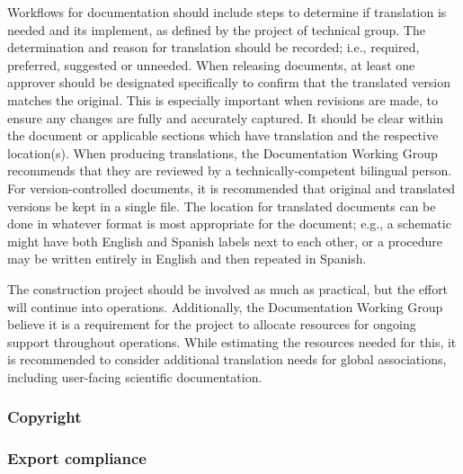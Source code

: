 Workflows for documentation should include steps to determine if translation is needed and its implement, as defined by the project of technical group.
The determination and reason for translation should be recorded; i.e., required, preferred, suggested or unneeded.
When releasing documents, at least one approver should be designated specifically to confirm that the translated version matches the original.
This is especially important when revisions are made, to ensure any changes are fully and accurately captured.
It should be clear within the document or applicable sections which have translation and the respective location(s).
When producing translations, the Documentation Working Group recommends that they are reviewed by a technically-competent bilingual person.
For version-controlled documents, it is recommended that original and translated versions be kept in a single file.
The location for translated documents can be done in whatever format is most appropriate for the document; e.g., a schematic might have both English and Spanish labels next to each other, or a procedure may be written entirely in English and then repeated in Spanish.

The construction project should be involved as much as practical, but the effort will continue into operations.
Additionally, the Documentation Working Group believe it is a requirement for the project to allocate resources for ongoing support throughout operations.
While estimating the resources needed for this, it is recommended to consider additional translation needs for global associations, including user-facing scientific documentation.

\subsubsection{Copyright}



\subsubsection{Export compliance}


